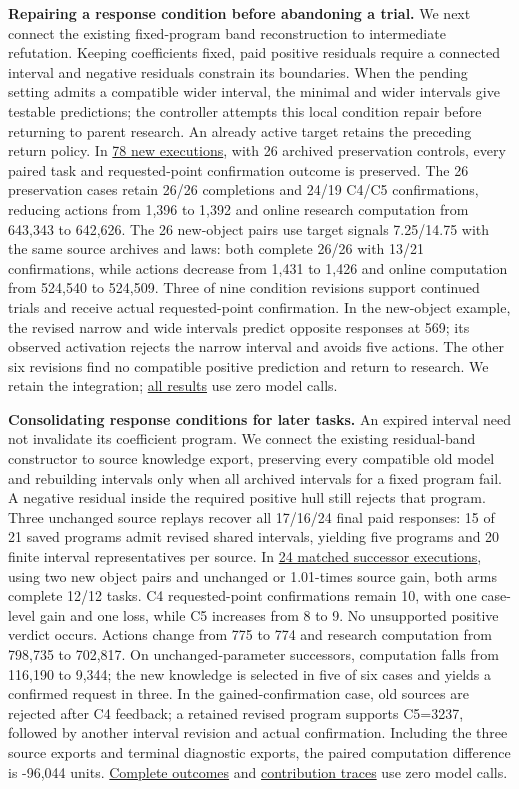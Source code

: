 \documentclass[twoside,11pt]{article}
\begin{document}
\textbf{Repairing a response condition before abandoning a trial.} We next connect the existing fixed-program band reconstruction to intermediate refutation. Keeping coefficients fixed, paid positive residuals require a connected interval and negative residuals constrain its boundaries. When the pending setting admits a compatible wider interval, the minimal and wider intervals give testable predictions; the controller attempts this local condition repair before returning to parent research. An already active target retains the preceding return policy. In \hyperlink{artifact-163}{78 new executions}, with 26 archived preservation controls, every paired task and requested-point confirmation outcome is preserved. The 26 preservation cases retain 26/26 completions and 24/19 C4/C5 confirmations, reducing actions from 1,396 to 1,392 and online research computation from 643,343 to 642,626. The 26 new-object pairs use target signals 7.25/14.75 with the same source archives and laws: both complete 26/26 with 13/21 confirmations, while actions decrease from 1,431 to 1,426 and online computation from 524,540 to 524,509. Three of nine condition revisions support continued trials and receive actual requested-point confirmation. In the new-object example, the revised narrow and wide intervals predict opposite responses at 569; its observed activation rejects the narrow interval and avoids five actions. The other six revisions find no compatible positive prediction and return to research. We retain the integration; \hyperlink{artifact-164}{all results} use zero model calls.


\textbf{Consolidating response conditions for later tasks.} An expired interval need not invalidate its coefficient program. We connect the existing residual-band constructor to source knowledge export, preserving every compatible old model and rebuilding intervals only when all archived intervals for a fixed program fail. A negative residual inside the required positive hull still rejects that program. Three unchanged source replays recover all 17/16/24 final paid responses: 15 of 21 saved programs admit revised shared intervals, yielding five programs and 20 finite interval representatives per source. In \hyperlink{artifact-165}{24 matched successor executions}, using two new object pairs and unchanged or 1.01-times source gain, both arms complete 12/12 tasks. C4 requested-point confirmations remain 10, with one case-level gain and one loss, while C5 increases from 8 to 9. No unsupported positive verdict occurs. Actions change from 775 to 774 and research computation from 798,735 to 702,817. On unchanged-parameter successors, computation falls from 116,190 to 9,344; the new knowledge is selected in five of six cases and yields a confirmed request in three. In the gained-confirmation case, old sources are rejected after C4 feedback; a retained revised program supports C5=3237, followed by another interval revision and actual confirmation. Including the three source exports and terminal diagnostic exports, the paired computation difference is -96,044 units. \hyperlink{artifact-166}{Complete outcomes} and \hyperlink{artifact-167}{contribution traces} use zero model calls.
\end{document}
